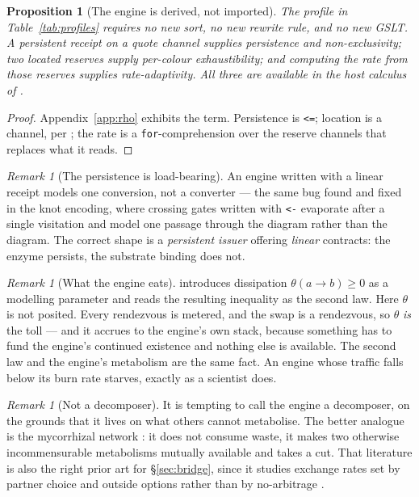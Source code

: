 \documentclass[11pt]{article}
\theoremstyle{plain}
\newtheorem{proposition}[theorem]{Proposition}
\theoremstyle{definition}
\theoremstyle{remark}
\newtheorem{remark}[theorem]{Remark}
\begin{document}
\begin{proposition}[The engine is derived, not imported]
The profile in Table~\ref{tab:profiles} requires no new sort, no new
rewrite rule, and no new GSLT. A persistent receipt on a quote channel
supplies persistence and non-exclusivity; two located reserves supply
per-colour exhaustibility; and computing the rate from those reserves
supplies rate-adaptivity. All three are available in the host calculus of
\cite{scientist}.
\end{proposition}

\begin{proof}
Appendix~\ref{app:rho} exhibits the term. Persistence is \texttt{<=};
location is a channel, per \cite[\S2.2]{finrho}; the rate is a
\texttt{for}-comprehension over the reserve channels that replaces what it
reads.
\end{proof}

\begin{remark}[The persistence is load-bearing]
An engine written with a linear receipt models one conversion, not a
converter --- the same bug found and fixed in the knot encoding, where
crossing gates written with \texttt{<-} evaporate after a single
visitation and model one passage through the diagram rather than the
diagram. The correct shape is a \emph{persistent issuer} offering
\emph{linear} contracts: the enzyme persists, the substrate binding does
not.
\end{remark}

\begin{remark}[What the engine eats]\label{rem:eats}
\cite[\S6]{vtok} introduces dissipation $\theta(a{\to}b) \geq 0$ as a
modelling parameter and reads the resulting inequality as the second law.
Here $\theta$ is not posited. Every rendezvous is metered, and the swap is
a rendezvous, so $\theta$ \emph{is} the toll --- and it accrues to the
engine's own stack, because something has to fund the engine's continued
existence and nothing else is available. The second law and the engine's
metabolism are the same fact. An engine whose traffic falls below its burn
rate starves, exactly as a scientist does.
\end{remark}

\begin{remark}[Not a decomposer]
It is tempting to call the engine a decomposer, on the grounds that it
lives on what others cannot metabolise. The better analogue is the
mycorrhizal network \cite{kiers}: it does not consume waste, it makes two
otherwise incommensurable metabolisms mutually available and takes a cut.
That literature is also the right prior art for
\S\ref{sec:bridge}, since it studies exchange rates set by partner choice
and outside options rather than by no-arbitrage \cite{noe}.
\end{remark}
\end{document}
